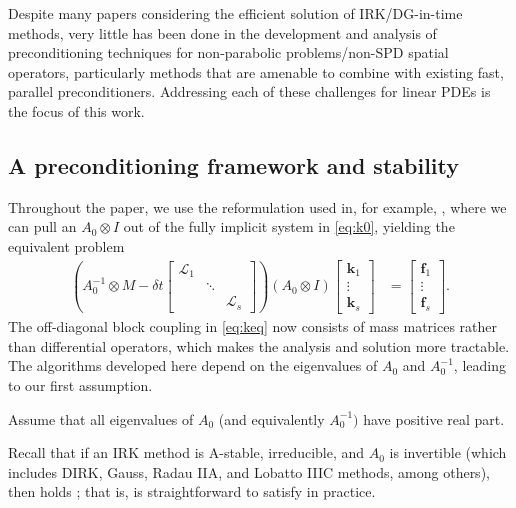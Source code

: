 \documentclass[review]{siamart}
\begin{document}
Despite many papers considering the efficient solution of IRK/DG-in-time methods,
very little has been done in the development and analysis of preconditioning techniques
for non-parabolic problems/non-SPD spatial operators, particularly methods that are
amenable to combine with existing fast, parallel preconditioners. Addressing each
of these challenges for linear PDEs is the focus of this work.

\subsection{A preconditioning framework and stability}\label{sec:intro:stab}

Throughout the paper, we use the reformulation used in, for example,
\cite{pazner17}, where we can pull an $A_0\otimes I$ out of the
fully implicit system in \eqref{eq:k0}, yielding the equivalent problem
%
\begin{align}\label{eq:keq}
\left( A_0^{-1}\otimes M - \delta t \begin{bmatrix} \mathcal{L}_1  & \\ & \ddots \\ && \mathcal{L}_s\end{bmatrix}\right)
	(A_0\otimes I)	\begin{bmatrix} \mathbf{k}_1 \\ \vdots \\ \mathbf{k}_s \end{bmatrix}
& = \begin{bmatrix} \mathbf{f}_1 \\ \vdots \\ \mathbf{f}_s \end{bmatrix}.
\end{align}
%
The off-diagonal block coupling in \eqref{eq:keq} now consists of mass matrices
rather than differential operators, which makes the analysis and solution more
tractable.
The algorithms developed here depend on the eigenvalues of $A_0$ and
$A_0^{-1}$, leading to our first assumption.
%
\begin{assumption} \label{ass:eig}
Assume that all eigenvalues of $A_0$ (and equivalently $A_0^{-1})$ have positive real part.
\end{assumption}
%
Recall that if an IRK method is A-stable, irreducible, and $A_0$ is invertible
(which includes DIRK, Gauss, Radau IIA, and Lobatto IIIC methods, among others),
then  holds \cite{hairer96}; that is,  is
straightforward to satisfy in practice.
\end{document}
